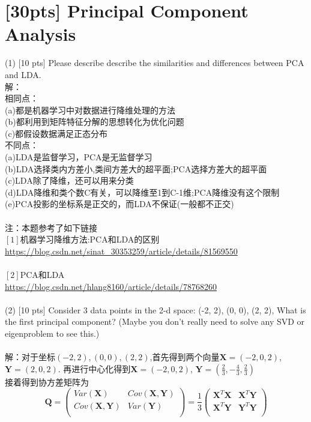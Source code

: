 \documentclass{article}
\begin{document}
	
\section{[30pts] Principal Component Analysis }
\noindent(1) [10 pts] Please describe describe the similarities and differences between PCA and LDA.\\
解：\\
相同点：\\
(a)都是机器学习中对数据进行降维处理的方法\\
(b)都利用到矩阵特征分解的思想转化为优化问题\\
(c)都假设数据满足正态分布\\
不同点：\\
(a)LDA是监督学习，PCA是无监督学习\\
(b)LDA选择类内方差小,类间方差大的超平面;PCA选择方差大的超平面\\
(c)LDA除了降维，还可以用来分类\\
(d)LDA降维和类个数C有关，可以降维至1到C-1维;PCA降维没有这个限制\\
(e)PCA投影的坐标系是正交的，而LDA不保证(一般都不正交)\\
\\注：本题参考了如下链接\\
$[1]$机器学习降维方法:PCA和LDA的区别\\
\url{https://blog.csdn.net/sinat_30353259/article/details/81569550}\\
\\$[2]$PCA和LDA\\
\url{https://blog.csdn.net/hlang8160/article/details/78768260}\\\\
(2) [10 pts] Consider 3 data points in the 2-d space: (-2, 2), (0, 0), (2, 2), What is the first principal component? (Maybe you don't really need to solve any SVD or eigenproblem to see this.)\\
\\解：对于坐标$(-2,2),(0,0),(2,2)$,首先得到两个向量$\bm{X}=(-2,0,2)$, $\bm{Y}=(2,0,2)$. 再进行中心化得到$\bm{X}=(-2,0,2)$, $\bm{Y}=(\frac{2}{3},-\frac{4}{3},\frac{2}{3})$\\
接着得到协方差矩阵为
\begin{equation}       
\bm{Q}=\left(                 
  \begin{array}{ccc}   
    Var(\bm{X}) & Cov(\bm{X},\bm{Y})\\  
    Cov({\bm{X},\bm{Y}}) & Var(\bm{Y}) \\ 
  \end{array}
\right)=\frac{1}{3}   \left(                 
  \begin{array}{ccc}   
   \bm{X}^T\bm{X} &  \bm{X}^T\bm{Y}\\  
     \bm{X}^T\bm{Y} &  \bm{Y}^T\bm{Y} \\ 
  \end{array}
\right)        
\end{equation}\\
\end{document}

